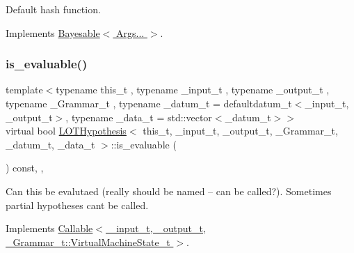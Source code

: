 Default hash function. 



Implements \hyperlink{class_bayesable_a26f6d55e7526ebd897cbb27c757b611b}{Bayesable$<$ Args... $>$}.

\mbox{\label{class_l_o_t_hypothesis_ac5d6d329147999aee0e37b51c6529385}} 
\subsubsection{\texorpdfstring{is\+\_\+evaluable()}{is\_evaluable()}}
{\footnotesize\ttfamily template$<$typename this\+\_\+t , typename \+\_\+input\+\_\+t , typename \+\_\+output\+\_\+t , typename \+\_\+\+Grammar\+\_\+t , typename \+\_\+datum\+\_\+t  = defaultdatum\+\_\+t$<$\+\_\+input\+\_\+t, \+\_\+output\+\_\+t$>$, typename \+\_\+data\+\_\+t  = std\+::vector$<$\+\_\+datum\+\_\+t$>$$>$ \\
virtual bool \hyperlink{class_l_o_t_hypothesis}{L\+O\+T\+Hypothesis}$<$ this\+\_\+t, \+\_\+input\+\_\+t, \+\_\+output\+\_\+t, \+\_\+\+Grammar\+\_\+t, \+\_\+datum\+\_\+t, \+\_\+data\+\_\+t $>$\+::is\+\_\+evaluable (\begin{DoxyParamCaption}{ }\end{DoxyParamCaption}) const\hspace{0.3cm}{\ttfamily [inline]}, {\ttfamily [override]}, {\ttfamily [virtual]}}



Can this be evalutaed (really should be named -- can be called?). Sometimes partial hypotheses can\textquotesingle{}t be called. 



Implements \hyperlink{class_callable_ac05ae8491f3b90986b1ad016da412afa}{Callable$<$ \+\_\+input\+\_\+t, \+\_\+output\+\_\+t, \+\_\+\+Grammar\+\_\+t\+::\+Virtual\+Machine\+State\+\_\+t $>$}.

\mbox{\label{class_l_o_t_hypothesis_a7c0e1a289a9166e4d2470f2e700a475d}} 
